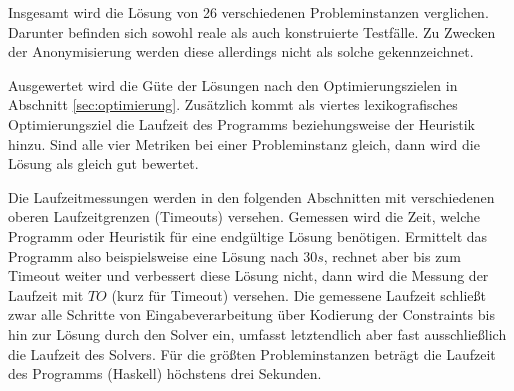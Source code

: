 Insgesamt wird die Lösung von 26 verschiedenen Probleminstanzen verglichen.
Darunter befinden sich sowohl reale als auch konstruierte Testfälle.
Zu Zwecken der Anonymisierung werden diese allerdings nicht als solche gekennzeichnet.

Ausgewertet wird die Güte der Lösungen nach den Optimierungszielen in Abschnitt \ref{sec:optimierung}.
Zusätzlich kommt als viertes lexikografisches Optimierungsziel die Laufzeit des Programms beziehungsweise der Heuristik hinzu.
Sind alle vier Metriken bei einer Probleminstanz gleich, dann wird die Lösung als gleich gut bewertet.

Die Laufzeitmessungen werden in den folgenden Abschnitten mit verschiedenen oberen Laufzeitgrenzen (Timeouts) versehen.
Gemessen wird die Zeit, welche Programm oder Heuristik für eine endgültige Lösung benötigen.
Ermittelt das Programm also beispielsweise eine Lösung nach $30s$, rechnet aber bis zum Timeout weiter und verbessert diese Lösung nicht,
dann wird die Messung der Laufzeit mit $TO$ (kurz für Timeout) versehen.
Die gemessene Laufzeit schließt zwar alle Schritte von Eingabeverarbeitung über Kodierung der Constraints bis hin zur Lösung durch den Solver ein,
umfasst letztendlich aber fast ausschließlich die Laufzeit des Solvers.
Für die größten Probleminstanzen beträgt die Laufzeit des Programms (Haskell) höchstens drei Sekunden.


